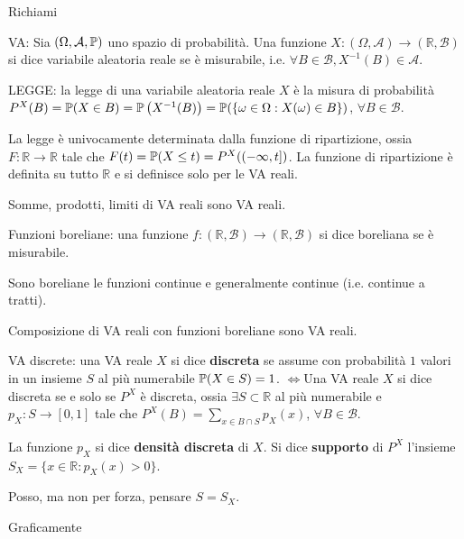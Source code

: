 
\ParteEsercizi

Richiami

VA: Sia $( \Omega ,\mathcal{A} ,\mathbb{P})$ uno spazio di probabilità. Una funzione $X:( \Omega ,\mathcal{A})\rightarrow (\mathbb{R} ,\mathcal{B})$ si dice variabile aleatoria reale se è misurabile, i.e. $\forall B\in \mathcal{B} ,X^{-1}( B) \in \mathcal{A}$.

LEGGE: la legge di una variabile aleatoria reale $X$ è la misura di probabilità $P^{X}( B) =\mathbb{P}( X\in B) =\mathbb{P}\left( X^{-1}( B)\right) =\mathbb{P}(\{\omega \in \Omega :X( \omega ) \in B\})$, $\forall B\in \mathcal{B}$.
\begin{oss}
	La legge è univocamente determinata dalla funzione di ripartizione, ossia $F:\mathbb{R}\rightarrow \mathbb{R}$ tale che $F( t) =\mathbb{P}( X\leq t) =P^{X}(( -\infty ,t])$. La funzione di ripartizione è definita su tutto $\mathbb{R}$ e si definisce solo per le VA reali.
\end{oss}
\begin{oss}
Somme, prodotti, limiti di VA reali sono VA reali.
\end{oss}
Funzioni boreliane: una funzione $f:(\mathbb{R} ,\mathcal{B})\rightarrow (\mathbb{R} ,\mathcal{B})$ si dice boreliana se è misurabile.
\begin{oss}
Sono boreliane le funzioni continue e generalmente continue (i.e. continue a tratti).
\end{oss}
\begin{oss}
Composizione di VA reali con funzioni boreliane sono VA reali.
\end{oss}
VA discrete: una VA reale $X$ si dice \textbf{discreta} se assume con probabilità $1$ valori in un insieme $S$ al più numerabile $\mathbb{P}( X\in S) =1$. $\iff $Una VA reale $X$ si dice discreta se e solo se $P^{X}$ è discreta, ossia $\exists S\subset \mathbb{R}$ al più numerabile e $p_{X} :S\rightarrow [ 0,1]$ tale che $P^{X}( B) =\sum\limits _{x\in B\cap S} p_{X}( x)$, $\forall B\in \mathcal{B}$.

La funzione $p_{X}$ si dice \textbf{densità discreta} di $X$. Si dice \textbf{supporto} di $P^{X}$ l'insieme $S_{X} =\{x\in \mathbb{R} :p_{X}( x)  >0\}$.
\begin{oss}
Posso, ma non per forza, pensare $S=S_{X}$.
\end{oss}
Graficamente




